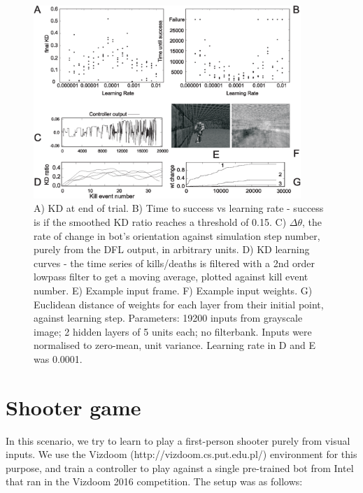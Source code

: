 \documentclass{aamas2018}
\begin{document}
\begin{figure}[!ht]
	\centering \includegraphics[width=0.9\textwidth]{FPSFig4}
	\caption{A) KD at end of trial. B) Time to success vs learning
          rate - success is if the smoothed KD ratio reaches a
          threshold of 0.15. C) $\Delta \theta$, the rate of change in
          bot's orientation against simulation step number, purely
          from the DFL output, in arbitrary units. D) KD learning
          curves - the time series of kills/deaths is filtered with a
          2nd order lowpass filter to get a moving average, plotted
          against kill event number. E) Example input frame. F) Example input weights. G) Euclidean distance of weights
          for each layer from their initial point, against learning
          step. 
          Parameters: 19200 inputs from grayscale image; 2
          hidden layers of 5 units each; no filterbank. Inputs were
          normalised to zero-mean, unit variance. Learning rate in D
          and E was 0.0001.
		\label{shooter_results}}
\end{figure}




\section{Shooter game}
In this scenario, we try to learn to play a first-person shooter
purely from visual inputs. We use the Vizdoom
(http://vizdoom.cs.put.edu.pl/) environment for this purpose, and
train a controller to play against a single pre-trained bot from Intel
that ran in the Vizdoom 2016 competition. The setup was as follows:
\end{document}
